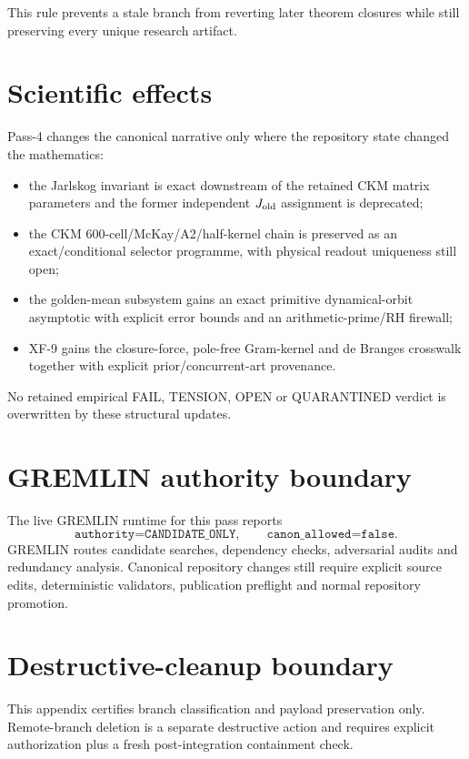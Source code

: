 This rule prevents a stale branch from reverting later theorem closures while
still preserving every unique research artifact.

\section{Scientific effects}

Pass-4 changes the canonical narrative only where the repository state changed
the mathematics:
\begin{itemize}
\item the Jarlskog invariant is exact downstream of the retained CKM matrix
      parameters and the former independent \(J_{\rm old}\) assignment is
      deprecated;
\item the CKM 600-cell/McKay/A2/half-kernel chain is preserved as an
      exact/conditional selector programme, with physical readout uniqueness
      still open;
\item the golden-mean subsystem gains an exact primitive dynamical-orbit
      asymptotic with explicit error bounds and an arithmetic-prime/RH
      firewall;
\item XF-9 gains the closure-force, pole-free Gram-kernel and de Branges
      crosswalk together with explicit prior/concurrent-art provenance.
\end{itemize}

No retained empirical FAIL, TENSION, OPEN or QUARANTINED verdict is overwritten
by these structural updates.

\section{GREMLIN authority boundary}

The live GREMLIN runtime for this pass reports
\[
\boxed{
\texttt{authority=CANDIDATE\_ONLY},
\qquad
\texttt{canon\_allowed=false}.
}
\]
GREMLIN routes candidate searches, dependency checks, adversarial audits and
redundancy analysis.  Canonical repository changes still require explicit
source edits, deterministic validators, publication preflight and normal
repository promotion.

\section{Destructive-cleanup boundary}

This appendix certifies branch classification and payload preservation only.
Remote-branch deletion is a separate destructive action and requires explicit
authorization plus a fresh post-integration containment check.
